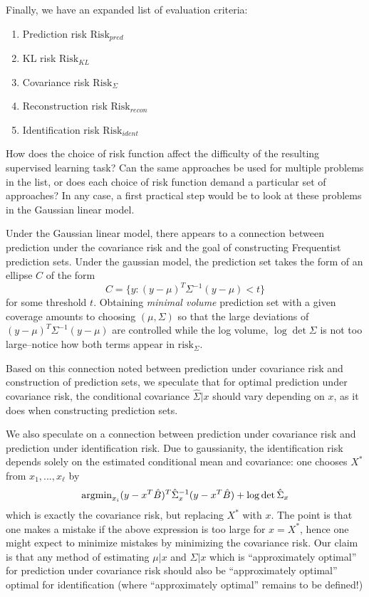 \documentclass[12pt]{article}
\begin{document}
Finally, we have an expanded list of evaluation criteria:
\begin{enumerate}
\item Prediction risk $\text{Risk}_{pred}$
\item KL risk $\text{Risk}_{KL}$
\item Covariance risk $\text{Risk}_{\Sigma}$
\item Reconstruction risk $\text{Risk}_{recon}$
\item Identification risk $\text{Risk}_{ident}$
\end{enumerate}

How does the choice of risk function affect the difficulty of the
resulting supervised learning task?  Can the same approaches be used
for multiple problems in the list, or does each choice of risk
function demand a particular set of approaches?  In any case, a first
practical step would be to look at these problems in the Gaussian
linear model.

Under the Gaussian linear model, there appears to a connection between
prediction under the covariance risk and the goal of constructing
Frequentist prediction sets. Under the gaussian model, the prediction
set takes the form of an ellipse $C$ of the form
\[
C = \{y: (y-\mu)^T \Sigma^{-1} (y - \mu) < t\}
\]
for some threshold $t$. Obtaining \emph{minimal volume} prediction set
with a given coverage amounts to choosing $(\mu, \Sigma)$ so that the
large deviations of $(y- \mu)^T \Sigma^{-1} (y - \mu)$ are controlled
while the log volume, $\log \det \Sigma$ is not too large--notice how
both terms appear in $\text{risk}_\Sigma$.

Based on this connection noted between prediction under covariance
risk and construction of prediction sets, we speculate that for
optimal prediction under covariance risk, the conditional covariance
$\hat{\Sigma}|x$ should vary depending on $x$, as it does when
constructing prediction sets.

We also speculate on a connection between prediction under
covariance risk and prediction under identification risk.  Due to gaussianity, the
identification risk depends solely on the estimated conditional mean
and covariance: one chooses $X^*$ from $x_1,...,x_\ell$ by
\[
\text{argmin}_{x_i}  (y - x^T \hat{B})^T \hat{\Sigma}_{x}^{-1} (y - x^T \hat{B}) + \log \det \hat{\Sigma}_{x}
\]
which is exactly the covariance risk, but replacing $X^*$ with $x$.
The point is that one makes a mistake if the above expression is too
large for $x = X^*$, hence one might expect to minimize mistakes by
minimizing the covariance risk.  Our claim is that any method of
estimating $\mu|x$ and $\Sigma|x$ which is ``approximately optimal''
for prediction under covariance risk should also be ``approximately
optimal'' optimal for identification (where ``approximately optimal''
remains to be defined!)
\end{document}
